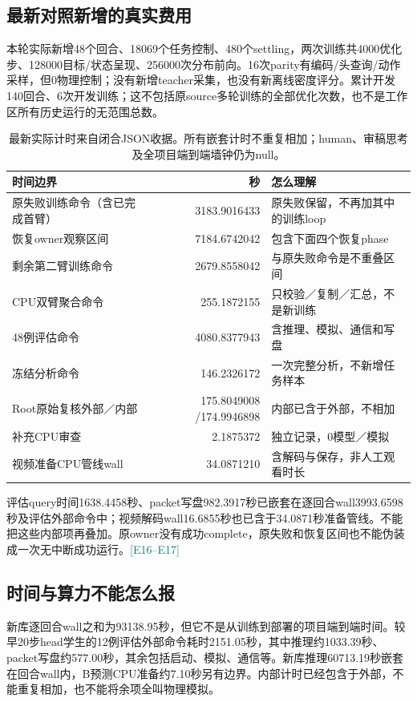 \documentclass[UTF8,a4paper,fontset=none,zihao=-4]{ctexart}
\newcommand{\ev}[1]{\textcolor{teal}{\small[#1]}}
\begin{document}
\subsection{最新对照新增的真实费用}
本轮实际新增48个回合、18069个任务控制、480个settling，两次训练共4000优化步、128000目标/状态呈现、256000次分布前向。16次parity有编码/头查询/动作采样，但0物理控制；没有新增teacher采集，也没有新离线密度评分。累计开发140回合、6次开发训练；这不包括原source多轮训练的全部优化次数，也不是工作区所有历史运行的无范围总数。
\par
\begin{table}[htbp]\centering\small
\begin{tabularx}{\textwidth}{Yrp{52mm}}\toprule
时间边界 & 秒 & 怎么理解\\\midrule
原失败训练命令（含已完成首臂） &3183.9016433&原失败保留，不再加其中的训练loop\\
恢复owner观察区间 &7184.6742042&包含下面四个恢复phase\\
\quad{}剩余第二臂训练命令 &2679.8558042&与原失败命令是不重叠区间\\
\quad{}CPU双臂聚合命令 &255.1872155&只校验／复制／汇总，不是新训练\\
\quad{}48例评估命令 &4080.8377943&含推理、模拟、通信和写盘\\
\quad{}冻结分析命令 &146.2326172&一次完整分析，不新增任务样本\\
Root原始复核外部／内部 &175.8049008 /174.9946898&内部已含于外部，不相加\\
补充CPU审查 &2.1875372&独立记录，0模型／模拟\\
视频准备CPU管线wall &34.0871210&含解码与保存，非人工观看时长\\\bottomrule
\end{tabularx}
\caption{最新实际计时来自闭合JSON收据。所有嵌套计时不重复相加；human、审稿思考及全项目端到端墙钟仍为null。}
\end{table}
\par
评估query时间1638.4458秒、packet写盘982.3917秒已嵌套在逐回合wall3993.6598秒及评估外部命令中；视频解码wall16.6855秒也已含于34.0871秒准备管线。不能把这些内部项再叠加。原owner没有成功complete，原失败和恢复区间也不能伪装成一次无中断成功运行。\ev{E16--E17}
\subsection{时间与算力不能怎么报}
新库逐回合wall之和为93138.95秒，但它不是从训练到部署的项目端到端时间。较早20步head学生的12例评估外部命令耗时2151.05秒，其中推理约1033.39秒、packet写盘约577.00秒，其余包括启动、模拟、通信等。新库推理60713.19秒嵌套在回合wall内，B预测CPU准备约7.10秒另有边界。内部计时已经包含于外部，不能重复相加，也不能将余项全叫物理模拟。
\end{document}
